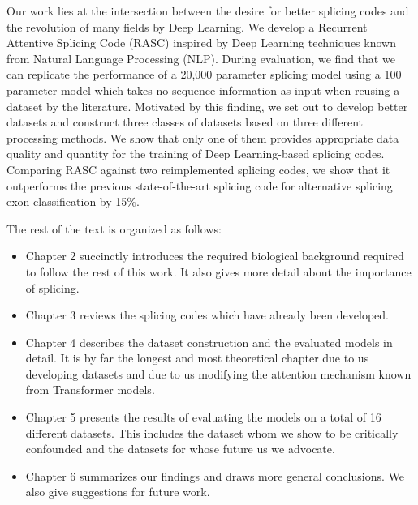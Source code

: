 

Our work lies at the intersection between the desire for better splicing codes and the revolution of many fields by Deep Learning. We develop a Recurrent Attentive Splicing Code (RASC) inspired by Deep Learning techniques known from Natural Language Processing (NLP). During evaluation, we find that we can replicate the performance of a 20,000 parameter splicing model using a 100 parameter model which takes no sequence information as input when reusing a dataset by the literature. Motivated by this finding, we set out to develop better datasets and construct three classes of datasets based on three different processing methods. We show that only one of them provides appropriate data quality and quantity for the training of Deep Learning-based splicing codes. Comparing RASC against two reimplemented splicing codes, we show that it outperforms the previous state-of-the-art splicing code for alternative splicing exon classification by 15\%. 




The rest of the text is organized as follows:
\begin{itemize}
	\item Chapter 2 succinctly introduces the required biological background required to follow the rest of this work. It also gives more detail about the importance of splicing.
	\item Chapter 3 reviews the splicing codes which have already been developed.
	\item Chapter 4 describes the dataset construction and the evaluated models in detail. It is by far the longest and most theoretical chapter due to us developing datasets and due to us modifying the attention mechanism known from Transformer models.
	\item Chapter 5 presents the results of evaluating the models on a total of 16 different datasets. This includes the dataset whom we show to be critically confounded and the datasets for whose future us we advocate.
	\item Chapter 6 summarizes our findings and draws more general conclusions. We also give suggestions for future work.
\end{itemize}
